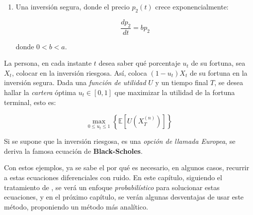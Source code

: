 \begin{enumerate}
\begin{enumerate}
		\item Una inversión segura, donde el precio $p_2 (t)$ crece exponencialmente:

		\[
			\frac{dp_2}{dt} = bp_2	
		\]

		donde $0 < b < a$.

	\end{enumerate}

	La persona, en cada instante $t$ desea saber qué porcentaje $u_t$ de su fortuna, sea $X_t$, colocar en la inversión riesgosa. Así, coloca $(1 - u_t)X_t$ de su fortuna en la inversión segura. Dada una \textit{función de utilidad} $U$ y un tiempo final $T$, se desea hallar la \textit{cartera} óptima $u_t \in [0, 1]$ que maximizar la utilidad de la fortuna terminal, esto es:

	\[
		\max_{0 \leq u_t \leq 1} \left\{  \mathbb{E}[ U(X_T^{(n)}) ] \right\}
	\]

	Si se supone que la inversión riesgosa, es una \textit{opción de llamada Europea}, se deriva la famosa ecuación de \textbf{Black-Scholes}.


\end{enumerate}


Con estos ejemplos, ya se sabe el por qué es necesario, en algunos casos, recurrir a estas ecuaciones diferenciales con ruido. En este capítulo, siguiendo el tratamiento de \cite{EDE_Oksendal}, se verá un enfoque \textit{probabilístico} para solucionar estas ecuaciones, y en el próximo capítulo, se verán algunas desventajas de usar este método, proponiendo un método más analítico.





























